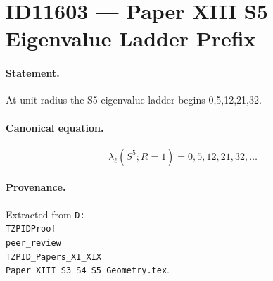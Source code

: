 \section*{ID11603 --- Paper XIII S5 Eigenvalue Ladder Prefix}

\paragraph{Statement.}
At unit radius the S5 eigenvalue ladder begins 0,5,12,21,32.

\paragraph{Canonical equation.}
\[
\lambda_\ell(S^5;R=1)=0,5,12,21,32,\ldots
\]

\paragraph{Provenance.}
Extracted from \texttt{D:\\TZPIDProof\\peer\_review\\TZPID\_Papers\_XI\_XIX\\Paper\_XIII\_S3\_S4\_S5\_Geometry.tex}.
